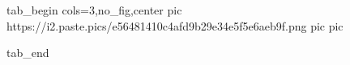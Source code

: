  
 
 
 
 
\zzSecCmtScr

\ifcmt
  tab_begin cols=3,no_fig,center
     pic https://i2.paste.pics/e56481410c4afd9b29e34e5f5e6aeb9f.png
		 pic 
		 pic 

  tab_end
\fi

